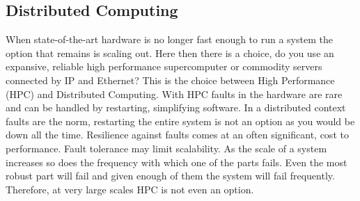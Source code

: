 \subsection{Distributed Computing}
When state-of-the-art hardware is no longer fast enough to run a system the option that remains is scaling out. Here then there is a choice, do you use an expansive, reliable high performance supercomputer or commodity servers connected by IP and Ethernet? This is the choice between High Performance (HPC) and Distributed Computing. With HPC faults in the hardware are rare and can be handled by restarting, simplifying software. In a distributed context faults are the norm, restarting the entire system is not an option as you would be down all the time. Resilience against faults comes at an often significant, cost to performance. Fault tolerance may limit scalability. As the scale of a system increases so does the frequency with which one of the parts fails. Even the most robust part will fail and given enough of them the system will fail frequently. Therefore, at very large scales HPC is not even an option. 
